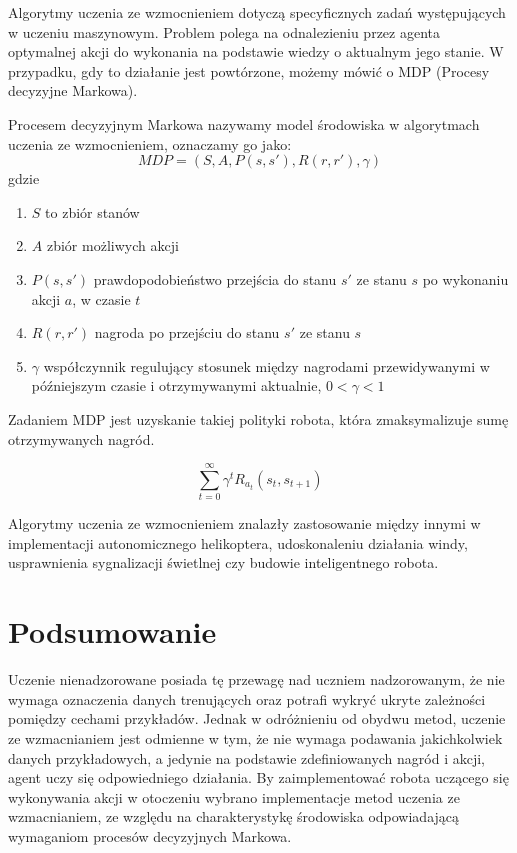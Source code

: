 Algorytmy uczenia ze wzmocnieniem dotyczą specyficznych zadań występujących w uczeniu maszynowym. Problem polega na 
odnalezieniu przez agenta optymalnej akcji do wykonania na podstawie wiedzy o aktualnym jego stanie. W przypadku, 
gdy to działanie jest powtórzone, możemy mówić o MDP (Procesy decyzyjne Markowa).

Procesem decyzyjnym Markowa nazywamy model środowiska w algorytmach uczenia ze wzmocnieniem, oznaczamy go jako:\\
$$MDP = (S, A, P(s, s'), R(r, r'), \gamma)$$
gdzie
\begin{enumerate}
 \item $S$ to zbiór stanów
 \item $A$ zbiór możliwych akcji
 \item $P(s, s')$ prawdopodobieństwo przejścia do stanu $s'$ ze stanu $s$ po wykonaniu akcji $a$, w czasie $t$
 \item $R(r, r')$ nagroda po przejściu do stanu $s'$ ze stanu $s$
 \item $\gamma$ współczynnik regulujący stosunek między nagrodami przewidywanymi w późniejszym czasie i 
otrzymywanymi aktualnie, $0 < \gamma < 1$
\end{enumerate}

Zadaniem MDP jest uzyskanie takiej polityki robota, która zmaksymalizuje sumę otrzymywanych nagród.

$$\sum\limits_{t=0}^\infty \gamma^{t} R_{a_{t}}(s_{t}, s_{t+1})$$

Algorytmy uczenia ze wzmocnieniem znalazły zastosowanie między innymi w implementacji autonomicznego 
helikoptera\cite{abbeel2007application}, udoskonaleniu działania windy\cite{barto1996improving}, usprawnienia 
sygnalizacji świetlnej\cite{wiering2000multi} czy budowie inteligentnego robota\cite{kimura2001reinforcement}.


\section{Podsumowanie}

Uczenie nienadzorowane posiada tę przewagę nad uczniem nadzorowanym, że nie wymaga oznaczenia danych trenujących 
oraz potrafi wykryć ukryte zależności pomiędzy cechami przykładów. Jednak w odróżnieniu od obydwu metod, uczenie ze 
wzmacnianiem jest odmienne w tym, że nie wymaga podawania jakichkolwiek danych przykładowych, a jedynie na podstawie 
zdefiniowanych nagród i akcji, agent uczy się odpowiedniego działania.
By zaimplementować robota uczącego się wykonywania akcji w otoczeniu wybrano implementacje metod uczenia ze 
wzmacnianiem, ze względu na charakterystykę środowiska odpowiadającą wymaganiom procesów decyzyjnych Markowa.













